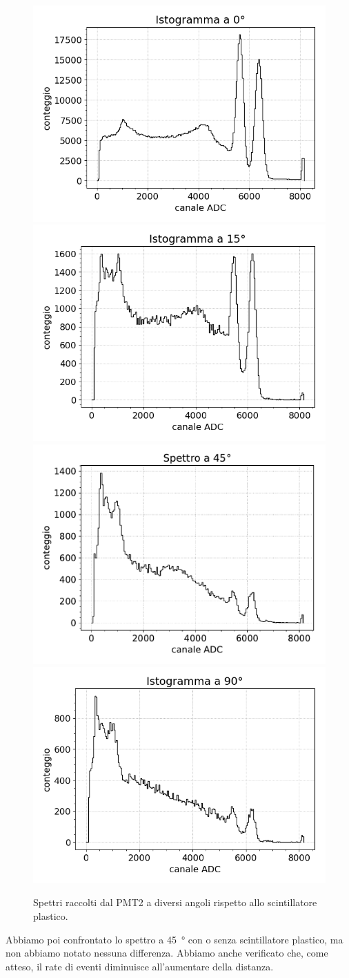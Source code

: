 \begin{figure}[h]
\centering

\subfloat
{\includegraphics[width= 16 em]{0g}} \qquad
\subfloat
{\includegraphics[width= 16 em]{15g}} \\

\subfloat
{\includegraphics[width= 16 em]{45g}} \qquad
\subfloat
{\includegraphics[width= 16 em]{90g}}

\caption{Spettri raccolti dal PMT2 a diversi angoli rispetto allo scintillatore plastico.}
\label{4ang}
\end{figure}

Abbiamo poi confrontato lo spettro a \SI{45}{\degree} con o senza scintillatore plastico, ma non abbiamo notato nessuna differenza. Abbiamo anche verificato che, come atteso, il rate di eventi diminuisce all'aumentare della distanza.

